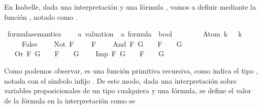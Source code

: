 \begin{isabellebody}
\begin{isamarkuptext}
  En Isabelle, dada una interpretación \isa{{\isasymA}} y una fórmula , vamos a 
  definir  mediante la función , 
  notado como .%
\end{isamarkuptext}\isamarkuptrue%
\isamarkupfalse%
\ formula{\isacharunderscore}semantics\ {\isacharcolon}{\isacharcolon}\ \isanewline
\ \ {\isachardoublequoteopen}{\isacharprime}a\ valuation\ {\isasymRightarrow}\ {\isacharprime}a\ formula\ {\isasymRightarrow}\ bool{\isachardoublequoteclose}\ {\isacharparenleft}\ {\isachardoublequoteopen}{\isasymTurnstile}{\isachardoublequoteclose}\ {}{}{\isacharparenright}\ \isanewline
\ \ {\isachardoublequoteopen}{\isasymA}\ {\isasymTurnstile}\ Atom\ k\ {\isacharequal}\ {\isasymA}\ k{\isachardoublequoteclose}\ \isanewline
{\isacharbar}\ {\isachardoublequoteopen}{\isasymA}\ {\isasymTurnstile}\ {\isasymbottom}\ {\isacharequal}\ False{\isachardoublequoteclose}\ \isanewline
{\isacharbar}\ {\isachardoublequoteopen}{\isasymA}\ {\isasymTurnstile}\ Not\ F\ {\isacharequal}\ {\isacharparenleft}{\isasymnot}\ {\isasymA}\ {\isasymTurnstile}\ F{\isacharparenright}{\isachardoublequoteclose}\ \isanewline
{\isacharbar}\ {\isachardoublequoteopen}{\isasymA}\ {\isasymTurnstile}\ And\ F\ G\ {\isacharequal}\ {\isacharparenleft}{\isasymA}\ {\isasymTurnstile}\ F\ {\isasymand}\ {\isasymA}\ {\isasymTurnstile}\ G{\isacharparenright}{\isachardoublequoteclose}\ \isanewline
{\isacharbar}\ {\isachardoublequoteopen}{\isasymA}\ {\isasymTurnstile}\ Or\ F\ G\ {\isacharequal}\ {\isacharparenleft}{\isasymA}\ {\isasymTurnstile}\ F\ {\isasymor}\ {\isasymA}\ {\isasymTurnstile}\ G{\isacharparenright}{\isachardoublequoteclose}\ \isanewline
{\isacharbar}\ {\isachardoublequoteopen}{\isasymA}\ {\isasymTurnstile}\ Imp\ F\ G\ {\isacharequal}\ {\isacharparenleft}{\isasymA}\ {\isasymTurnstile}\ F\ {\isasymlongrightarrow}\ {\isasymA}\ {\isasymTurnstile}\ G{\isacharparenright}{\isachardoublequoteclose}%
\begin{isamarkuptext}%
Como podemos observar,  es una función
  primitiva recursiva, como indica el tipo , notada con el 
  símbolo infijo \isa{{\isasymTurnstile}}. De este modo, dada una interpretación \isa{{\isasymA}} sobre 
  variables proposicionales de un tipo  cualquiera y una fórmula,
  se define el valor de la fórmula en la interpretación \isa{{\isasymA}} como se 

\end{isamarkuptext}
\end{isabellebody}
